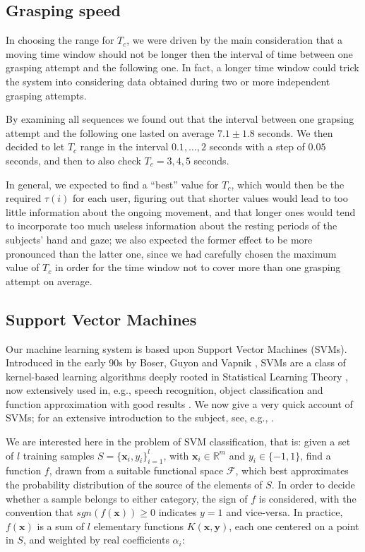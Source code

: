 \documentclass[a4paper,10pt,conference]{ieeeconf}
\def\RR{\mathbb{R}}
\def\xx{\mathbf{x}}
\def\yy{\mathbf{y}}
\begin{document}
\subsection{Grasping speed}

In choosing the range for $T_c$, we were driven by the main
consideration that a moving time window should not be longer then the
interval of time between one grasping attempt and the following
one. In fact, a longer time window could trick the system into
considering data obtained during two or more independent grasping
attempts.

By examining all sequences we found out that the interval between one
grapsing attempt and the following one lasted on average $7.1 \pm 1.8$
seconds. We then decided to let $T_c$ range in the interval
$0.1,\ldots,2$ seconds with a step of $0.05$ seconds, and then to also
check $T_c=3,4,5$ seconds.

In general, we expected to find a ``best'' value for $T_c$, which
would then be the required $\tau(i)$ for each user, figuring out that
shorter values would lead to too little information about the ongoing
movement, and that longer ones would tend to incorporate too much
useless information about the resting periods of the subjects' hand
and gaze; we also expected the former effect to be more pronounced
than the latter one, since we had carefully chosen the maximum value
of $T_c$ in order for the time window not to cover more than one
grasping attempt on average.

\subsection{Support Vector Machines}
\label{subsec:svm}

Our machine learning system is based upon Support Vector Machines
(SVMs). Introduced in the early 90s by Boser, Guyon and Vapnik
\cite{BGV92}, SVMs are a class of kernel-based learning algorithms
deeply rooted in Statistical Learning Theory \cite{v-edbed-82}, now
extensively used in, e.g., speech recognition, object classification
and function approximation with good results \cite{Cristianini00}. We
now give a very quick account of SVMs; for an extensive introduction
to the subject, see, e.g., \cite{SmolaTut2004}.

We are interested here in the problem of SVM classification, that is:
given a set of $l$ training samples $S=\{\xx_i,y_i\}_{i=1}^l$, with
$\xx_i \in \RR^m$ and $y_i \in \{-1,1\}$, find a function $f$, drawn
from a suitable functional space $\mathcal{F}$, which best
approximates the probability distribution of the source of the
elements of $S$. In order to decide whether a sample belongs to either
category, the sign of $f$ is considered, with the convention that
$sgn(f(\xx)) \geq 0$ indicates $y = 1$ and vice-versa. In practice,
$f(\xx)$ is a sum of $l$ elementary functions $K(\xx,\yy)$, each one
centered on a point in $S$, and weighted by real coefficients
$\alpha_i$:
\end{document}
